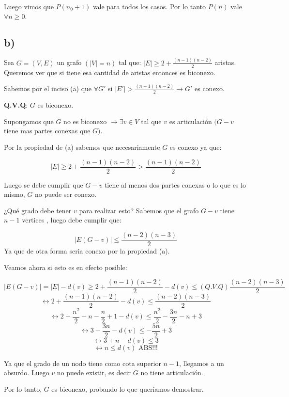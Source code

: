 \documentclass{article}
\begin{document}
Luego vimos que $P(n_0 +1)$ vale para todos los casos. 
Por lo tanto $P(n)$ vale $\forall n \geq 0$.

\newpage



\subsection{b)}


Sea $G = (V,E)$ un grafo $(|V| = n)$ tal que: $|E| \geq 2 + \frac{(n-1)(n-2)}{2}$ aristas. Queremos ver que si tiene esa cantidad de aristas entonces es biconexo.

Sabemos por el inciso (a) que $\forall G'$ si $|E'| > \frac{(n-1)(n-2)}{2}  \rightarrow G'$ es conexo.

\textbf{Q.V.Q}: $G$ es biconexo.

Supongamos que $G$ no es biconexo $\rightarrow \exists v \in V$ tal que $v$ es articulación  $(G-v$ tiene mas partes conexas que $G)$.

Por la propiedad de (a) sabemos que necesariamente $G$ es conexo ya que:

\[ |E| \geq 2 + \frac{(n-1)(n-2)}{2} > \frac{(n-1)(n-2)}{2} \]

Luego se debe cumplir que $G - v$ tiene al menos dos partes conexas o lo que es lo mismo, $G$ no puede ser conexo.

¿Qué grado debe tener $v$ para realizar esto? Sabemos que el grafo $G-v$ tiene $n - 1$ vertices , luego debe cumplir que:

\[ |E(G-v)| \leq \frac{(n-2)(n-3)}{2} \]
Ya que de otra forma seria conexo por la propiedad (a).

Veamos ahora si esto es en efecto posible:

\[ |E(G-v)| = |E| - d(v) \geq 2 + \frac{(n-1)(n-2)}{2} - d(v)  \leq (Q.V.Q) \frac{(n-2)(n-3)}{2} \]
\[ \leftrightarrow 2 + \frac{(n-1)(n-2)}{2} - d(v)  \leq \frac{(n-2)(n-3)}{2}  \]
\[ \leftrightarrow 2 + \frac{n^2}{2} - n - \frac{n}{2} + 1 -d(v) \leq \frac{n^2}{2} - \frac{3n}{2} - n + 3 \]
\[ \leftrightarrow 3 - \frac{3n}{2}  - d(v) \leq -\frac{5n}{2} + 3 \]
\[ \leftrightarrow 3 + n - d(v) \leq 3 \]
\[ \leftrightarrow n \leq d(v) \text{ ABS!!!} \]

Ya que el grado de un nodo tiene como cota superior $n-1$, llegamos a un absurdo. Luego $v$ no puede existir, es decir $G$ no tiene articulación.

Por lo tanto, $G$ es biconexo, probando lo que queríamos demostrar.
\end{document}
